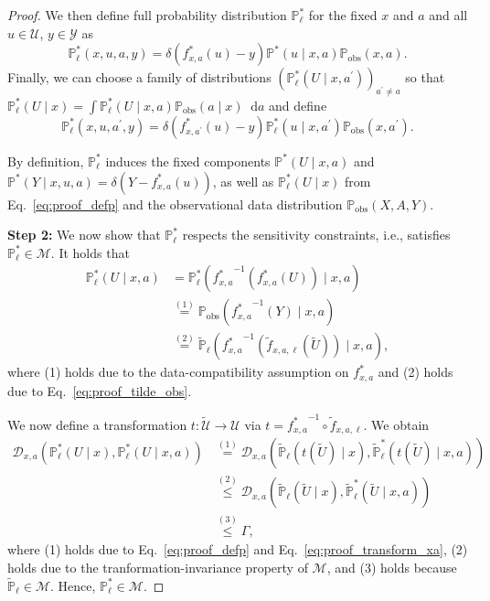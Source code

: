 \documentclass{article} %
\newcommand*\diff{\mathop{}\!\mathrm{d}}
\theoremstyle{definition}
\theoremstyle{plain}
\begin{document}
\begin{proof}
We then define full probability distribution $\mathbb{P}_\ell^\ast$ for the fixed $x$ and $a$ and all $u\in \mathcal{U}$, $y \in \mathcal{Y}$ as
\begin{equation}
    \mathbb{P}_\ell^\ast(x, u, a, y) = \delta \left(f^\ast_{x, a}(u) - y \right) \mathbb{P}^\ast(u \mid x, a) \mathbb{P}_\mathrm{obs}(x, a).
\end{equation}
Finally, we can choose a family of distributions $(\mathbb{P}_\ell^\ast(U \mid x, a^\prime))_{a^\prime \neq a}$ so that $\mathbb{P}_\ell^\ast(U \mid x) = \int \mathbb{P}_\ell^\ast(U \mid x, a) \mathbb{P}_\mathrm{obs}(a \mid x) \diff a$ and define
\begin{equation}
    \mathbb{P}_\ell^\ast(x, u, a^\prime, y) = \delta\left(f^\ast_{x, a^\prime}(u) - y\right) \mathbb{P}_\ell^\ast(u \mid x, a^\prime) \mathbb{P}_\mathrm{obs}(x, a^\prime).
\end{equation}

By definition, $\mathbb{P}_\ell^\ast$ induces the fixed components $\mathbb{P}^\ast(U \mid x, a)$ and $\mathbb{P}^\ast(Y \mid x, u, a) = \delta(Y - f^\ast_{x, a}(u))$, as well as $\mathbb{P}_\ell^\ast(U \mid x)$ from Eq.~\eqref{eq:proof_defp} and the observational data distribution $\mathbb{P}_\mathrm{obs}(X, A, Y)$.

\textbf{Step 2:} We now show that $\mathbb{P}_\ell^\ast$ respects the sensitivity constraints, i.e., satisfies $\mathbb{P}_\ell^\ast \in \mathcal{M}$. It holds that
\begin{align}\label{eq:proof_transform_xa}
\mathbb{P}_\ell^\ast(U \mid x, a) &= {\mathbb{P}}_\ell^\ast({f^\ast_{x, a}}^{-1} \left(f^\ast_{x, a}(U) \right)\mid x, a) \\ & \overset{(1)}{=}{\mathbb{P}}_\mathrm{obs}({f^\ast_{x, a}}^{-1} \left(Y\right)\mid x, a) \\ & \overset{(2)}{=} \widetilde{\mathbb{P}}_\ell({f^\ast_{x, a}}^{-1} \left(\widetilde{f}_{x, a, \ell}(\widetilde{U}) \right)\mid x, a),
\end{align}
where (1) holds due to the data-compatibility assumption on $f^\ast_{x, a}$ and (2) holds due to Eq.~\eqref{eq:proof_tilde_obs}.

We now define a transformation $t \colon \widetilde{\mathcal{U}} \to \mathcal{U}$ via $t = {f^\ast_{x, a}}^{-1} \circ \widetilde{f}_{x, a, \ell}$. We obtain
\begin{align}
  \mathcal{D}_{x, a}(\mathbb{P}_\ell^\ast(U \mid x), \mathbb{P}_\ell^\ast(U \mid x, a)) &\overset{(1)}{=} \mathcal{D}_{x, a}(\widetilde{\mathbb{P}}_\ell(t(\widetilde{U}) \mid x), \widetilde{\mathbb{P}}_\ell^\ast(t(\widetilde{U}) \mid x, a)) \\ & \overset{(2)}{\leq} \mathcal{D}_{x, a}(\widetilde{\mathbb{P}}_\ell(\widetilde{U} \mid x), \widetilde{\mathbb{P}}_\ell^\ast(\widetilde{U} \mid x, a))\\ & \overset{(3)}{\leq} \Gamma,
\end{align}
where (1) holds due to Eq.~\eqref{eq:proof_defp} and Eq.~\eqref{eq:proof_transform_xa}, (2) holds due to the tranformation-invariance property of $\mathcal{M}$, and (3) holds because $\widetilde{\mathbb{P}}_\ell \in \mathcal{M}$.
Hence, $\mathbb{P}_\ell^\ast \in \mathcal{M}$.


\end{proof}
\end{document}
